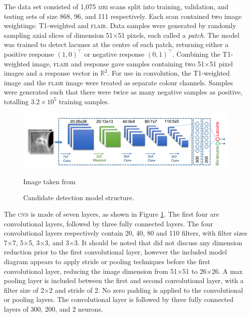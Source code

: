 The data set consisted of 1,075 \textsc{mri} scans split into training, validation, and testing sets of size 868, 96, and 111 respectively. Each scan contained two image weightings: T1-weighted and \textsc{flair}. Data samples were generated by randomly sampling axial slices of dimension 51$\times$51 pixels, each called a \textit{patch}. The model was trained to detect lacunes at the centre of each patch, returning either a positive response $(1, 0)^\intercal$ or negative response $(0, 1)^\intercal$. Combining the T1-weighted image, \textsc{flair} and response gave samples containing two 51$\times$51 pixel images and a response vector in $\mathbb{R}^2$. For use in convolution, the T1-weighted image and the \textsc{flair} image were treated as separate colour channels. Samples were generated such that there were twice as many negative samples as positive, totalling $3.2\times10^5$ training samples.

\begin{figure}[ht]
	\centering
	\includegraphics[width=\textwidth]{Images/5_ghafoorian_model1.png}
	\caption{Candidate detection model structure.}
	\small Image taken from \citep{GhafoorianM.2017Dml3}
	\label{litrev-ghafoorian_model1fig}
\end{figure}

The \textsc{cnn} is made of seven layers, as shown in Figure \ref{litrev-ghafoorian_model1fig}. The first four are convolutional layers, followed by three fully connected layers. The four convolutional layers respectively contain 20, 40, 80 and 110 filters, with filter sizes 7$\times$7, 5$\times$5, 3$\times$3, and 3$\times$3. It should be noted that \cite{GhafoorianM.2017Dml3} did not discuss any dimension reduction prior to the first convolutional layer, however the included model diagram appears to apply stride or pooling techniques before the first convolutional layer, reducing the image dimension from 51$\times$51 to 26$\times$26. A max pooling layer is included between the first and second convolutional layer, with a filter size of 2$\times$2 and stride of 2. No zero padding is applied to the convolutional or pooling layers. The convolutional layer is followed by three fully connected layers of 300, 200, and 2 neurons.

